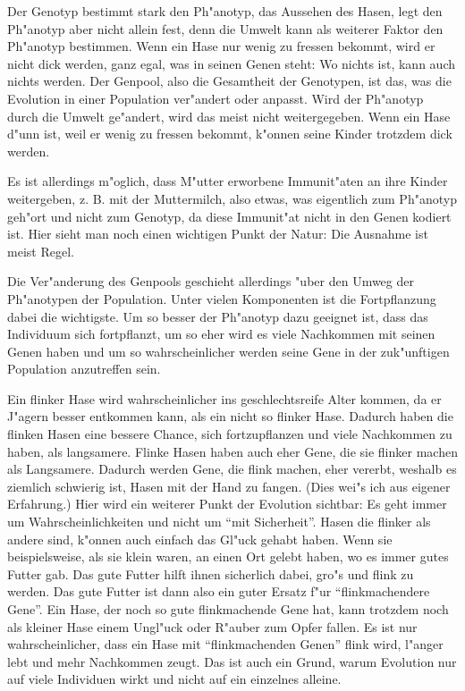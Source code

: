 Der Genotyp bestimmt stark den Ph"anotyp, das Aussehen des Hasen, legt den Ph"anotyp aber nicht allein fest, denn die Umwelt kann als weiterer Faktor den Ph"anotyp bestimmen. Wenn ein Hase nur wenig zu fressen bekommt, wird er nicht dick werden, ganz egal, was in seinen Genen steht: Wo nichts ist, kann auch nichts werden.
Der Genpool, also die Gesamtheit der Genotypen, ist das, was die Evolution in einer Population ver"andert oder anpasst. Wird der Ph"anotyp durch die Umwelt ge"andert, wird das meist nicht weitergegeben. Wenn ein Hase d"unn ist, weil er wenig zu fressen bekommt, k"onnen seine Kinder trotzdem dick werden. 

Es ist allerdings m"oglich, dass M"utter erworbene Immunit"aten an ihre Kinder weitergeben, z. B. mit der Muttermilch, also etwas, was eigentlich zum Ph"anotyp geh"ort und nicht zum Genotyp, da diese Immunit"at nicht in den Genen kodiert ist. Hier sieht man noch einen wichtigen Punkt der Natur: Die Ausnahme ist meist Regel.

Die Ver"anderung des Genpools geschieht allerdings "uber den Umweg der Ph"anotypen der Population. 
Unter vielen Komponenten ist die Fortpflanzung dabei die wichtigste. Um so besser der Ph"anotyp dazu geeignet ist, dass das Individuum sich fortpflanzt, um so eher wird es viele Nachkommen mit seinen Genen haben und um so wahrscheinlicher werden seine Gene in der zuk"unftigen Population anzutreffen sein.

Ein flinker Hase wird wahrscheinlicher ins geschlechtsreife Alter kommen, da er J"agern besser entkommen kann, als ein nicht so flinker Hase. Dadurch haben die flinken Hasen eine bessere Chance, sich fortzupflanzen und viele Nachkommen zu haben, als langsamere. Flinke Hasen haben auch eher Gene, die sie flinker machen als Langsamere. Dadurch werden Gene, die flink machen, eher vererbt, weshalb es ziemlich schwierig ist, Hasen mit der Hand zu fangen. (Dies wei"s ich aus eigener Erfahrung.)
Hier wird ein weiterer Punkt der Evolution sichtbar: Es geht immer um Wahrscheinlichkeiten und nicht um ``mit Sicherheit''.
Hasen die flinker als andere sind, k"onnen auch einfach das Gl"uck gehabt haben. Wenn sie beispielsweise, als sie klein waren, an einen Ort gelebt haben, wo es immer gutes Futter gab. Das gute Futter hilft ihnen sicherlich dabei, gro"s und flink zu werden. Das gute Futter ist dann also ein guter Ersatz f"ur ``flinkmachendere Gene''.
Ein Hase, der noch so gute flinkmachende Gene hat, kann trotzdem noch als kleiner Hase einem Ungl"uck oder R"auber zum Opfer fallen. Es ist nur wahrscheinlicher, dass ein Hase mit ``flinkmachenden Genen'' flink wird, l"anger lebt und mehr Nachkommen zeugt. Das ist auch ein Grund, warum Evolution nur auf viele Individuen wirkt und nicht auf ein einzelnes alleine.

